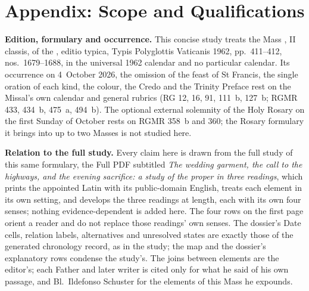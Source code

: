 
\section{Appendix: Scope and Qualifications}

{\footnotesize
\textbf{Edition, formulary and occurrence.} This concise study treats the Mass
, II classis, of the
, editio typica, Typis Polyglottis Vaticanis 1962,
pp.~411--412, nos.~1679--1688, in the universal 1962 calendar and no particular
calendar. Its occurrence on 4~October 2026, the omission of the feast of St
Francis, the single oration of each kind, the colour, the Credo and the Trinity
Preface rest on the Missal's own calendar and general rubrics (RG 12, 16, 91,
111~b, 127~b; RGMR 433, 434~b, 475~a, 494~b). The optional external solemnity
of the Holy Rosary on the first Sunday of October rests on RGMR 358~b and 360;
the Rosary formulary it brings into up to two Masses is not studied here.

\textbf{Relation to the full study.} Every claim here is drawn from the full
study of this same formulary, the Full PDF subtitled \textit{The wedding
garment, the call to the highways, and the evening sacrifice: a study of the
proper in three readings}, which prints the appointed Latin with its public-domain English,
treats each element in its own setting, and develops the three readings at
length, each with its own four senses; nothing evidence-dependent is added here.
The four rows on the first page orient a reader and do not replace those
readings' own senses. The dossier's Date cells, relation labels, alternatives
and unresolved states are exactly those of the generated chronology record, as
in the study; the map and the dossier's explanatory rows condense the study's.
The joins between elements are the editor's; each Father and later writer is
cited only for what he said of his own passage, and Bl.\ Ildefonso Schuster for
the elements of this Mass he expounds.

}
